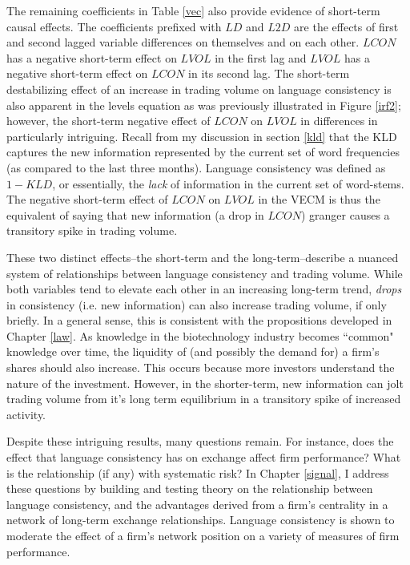 The remaining coefficients in Table \ref{vec} also provide evidence of short-term causal effects. The coefficients prefixed with $LD$ and $L2D$ are the effects of first and second lagged variable differences on themselves and on each other. $LCON$ has a negative short-term effect on $LVOL$ in the first lag and $LVOL$ has a negative short-term effect on $LCON$ in its second lag. The short-term destabilizing effect of an increase in trading volume on language consistency is also apparent in the levels equation as was previously illustrated in Figure \ref{irf2}; however, the short-term negative effect of $LCON$ on $LVOL$ in differences in particularly intriguing. Recall from my discussion in section \ref{kld} that the KLD captures the new information represented by the current set of word frequencies (as compared to the last three months). Language consistency was defined as $1-KLD$, or essentially, the \emph{lack} of information in the current set of word-stems. The negative short-term effect of $LCON$ on $LVOL$ in the VECM is thus the equivalent of saying that new information (a drop in $LCON$) granger causes a transitory spike in trading volume.

These two distinct effects--the short-term and the long-term--describe a nuanced system of relationships between language consistency and trading volume. While both variables tend to elevate each other in an increasing long-term trend, \emph{drops} in consistency (i.e. new information) can also increase trading volume, if only briefly. In a general sense, this is consistent with the propositions developed in Chapter \ref{law}. As knowledge in the  biotechnology industry becomes ``common" knowledge over time, the liquidity of (and possibly the demand for) a firm's shares should also increase. This occurs because more investors understand the nature of the investment. However, in the shorter-term, new information can jolt trading volume from it's long term equilibrium in a transitory spike of increased activity.

Despite these intriguing results, many questions remain. For instance, does the effect that language consistency has on exchange affect firm performance? What is the relationship (if any) with systematic risk? In Chapter \ref{signal}, I address these questions by building and testing theory on the relationship between language consistency, and the advantages derived from a firm's centrality in a network of long-term exchange relationships. Language consistency is shown to moderate the effect of a firm's network position on a variety of measures of firm performance.


